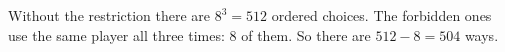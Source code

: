 Without the restriction there are $8^3=512$ ordered choices. The forbidden ones use the same player all three times: $8$ of them. So there are $512-8=\boxed{504}$ ways.
